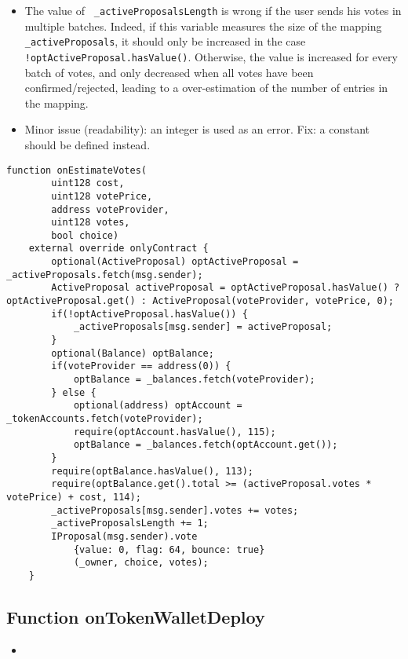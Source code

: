 \begin{itemize}
\item {} {The value of {\tt
    \_activeProposalsLength} is wrong if the user sends his votes in
  multiple batches. Indeed, if this variable measures the size of the
  mapping {\tt \_activeProposals}, it should only be increased in the
  case {\tt !optActiveProposal.hasValue()}. Otherwise, the value is
  increased for every batch of votes, and only decreased when all
  votes have been confirmed/rejected, leading to a over-estimation of
  the number of entries in the mapping.}
\item Minor issue (readability): an integer is used as an error. Fix:
  a constant should be defined instead.
\end{itemize}

\begin{lstlisting}[firstnumber=60]
    function onEstimateVotes(
        uint128 cost,
        uint128 votePrice,
        address voteProvider,
        uint128 votes,
        bool choice)
    external override onlyContract {
        optional(ActiveProposal) optActiveProposal = _activeProposals.fetch(msg.sender);
        ActiveProposal activeProposal = optActiveProposal.hasValue() ? optActiveProposal.get() : ActiveProposal(voteProvider, votePrice, 0);
        if(!optActiveProposal.hasValue()) {
            _activeProposals[msg.sender] = activeProposal;
        }
        optional(Balance) optBalance;
        if(voteProvider == address(0)) {
            optBalance = _balances.fetch(voteProvider);
        } else {
            optional(address) optAccount = _tokenAccounts.fetch(voteProvider);
            require(optAccount.hasValue(), 115);
            optBalance = _balances.fetch(optAccount.get());
        }
        require(optBalance.hasValue(), 113);
        require(optBalance.get().total >= (activeProposal.votes * votePrice) + cost, 114);
        _activeProposals[msg.sender].votes += votes;
        _activeProposalsLength += 1;
        IProposal(msg.sender).vote
            {value: 0, flag: 64, bounce: true}
            (_owner, choice, votes);
    }
\end{lstlisting}

\subsection{Function onTokenWalletDeploy}

\begin{itemize}
\item {}
\end{itemize}

